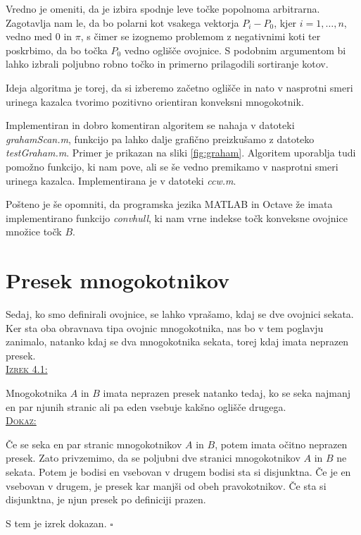 \documentclass[a4paper, 12pt]{article} %
\newenvironment{matematika}[1]{
{\underline{\textsc{#1:}}}
}{
}
\begin{document}
Vredno je omeniti, da je izbira spodnje leve točke popolnoma arbitrarna. Zagotavlja nam le, da bo polarni kot vsakega vektorja $P_i - P_0$, kjer $i = 1, \dots, n$, vedno med $0$ in $\pi$, s čimer se izognemo problemom z negativnimi koti ter poskrbimo, da bo točka $P_0$ vedno oglišče ovojnice. S podobnim argumentom bi lahko izbrali poljubno robno točko in primerno prilagodili sortiranje kotov.


Ideja algoritma je torej, da si izberemo začetno oglišče in nato v nasprotni smeri urinega kazalca tvorimo pozitivno orientiran konveksni mnogokotnik.


Implementiran in dobro komentiran algoritem se nahaja v datoteki \emph{grahamScan.m}, funkcijo pa lahko dalje grafično preizkušamo z datoteko \emph{testGraham.m}. Primer je prikazan na sliki \ref{fig:graham}. Algoritem uporablja tudi pomožno funkcijo, ki nam pove, ali se še vedno premikamo v nasprotni smeri urinega kazalca. Implementirana je v datoteki \emph{ccw.m}.


Pošteno je še opomniti, da programska jezika MATLAB in Octave že imata implementirano funkcijo \emph{convhull}, ki nam vrne indekse točk konveksne ovojnice množice točk $B$.

\section{Presek mnogokotnikov}

Sedaj, ko smo definirali ovojnice, se lahko vprašamo, kdaj se dve ovojnici sekata. Ker sta oba obravnava tipa ovojnic mnogokotnika, nas bo v tem poglavju zanimalo, natanko kdaj se dva mnogokotnika sekata, torej kdaj imata neprazen presek.\\
\begin{matematika}{Izrek 4.1}
Mnogokotnika $A$ in $B$ imata neprazen presek natanko tedaj, ko se seka najmanj en par njunih stranic ali pa eden vsebuje kakšno oglišče drugega.\\
\end{matematika}
\begin{matematika}{Dokaz}
Če se seka en par stranic mnogokotnikov $A$ in $B$, potem imata očitno neprazen presek.
Zato privzemimo, da se poljubni dve stranici mnogokotnikov $A$ in $B$ ne sekata. Potem je bodisi en vsebovan v drugem bodisi sta si disjunktna. Če je en vsebovan v drugem, je presek kar manjši od obeh pravokotnikov. Če sta si disjunktna, je njun presek po definiciji prazen.

S tem je izrek dokazan.\hspace*{\fill} $\square$
\end{matematika}
\end{document}
